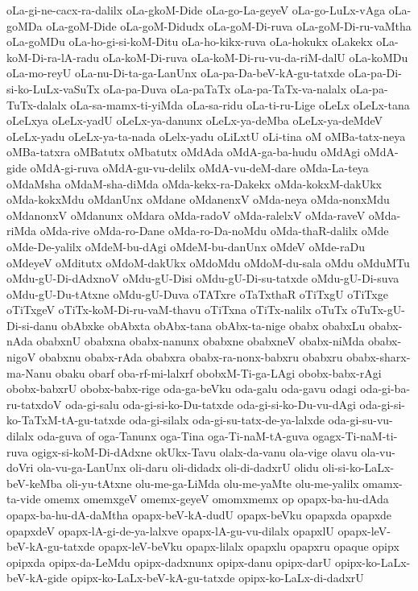 {oLa-gi-ne-cacx-ra-dalilx
oLa-gkoM-Dide
oLa-go-La-geyeV
oLa-go-LuLx-vAga
oLa-goMDa
oLa-goM-Dide
oLa-goM-Didudx
oLa-goM-Di-ruva
oLa-goM-Di-ru-vaMtha
oLa-goMDu
oLa-ho-gi-si-koM-Ditu
oLa-ho-kikx-ruva
oLa-hokukx
oLakekx
oLa-koM-Di-ra-lA-radu
oLa-koM-Di-ruva
oLa-koM-Di-ru-vu-da-riM-dalU
oLa-koMDu
oLa-mo-reyU
oLa-nu-Di-ta-ga-LanUnx
oLa-pa-Da-beV-kA-gu-tatxde
oLa-pa-Di-si-ko-LuLx-vaSuTx
oLa-pa-Duva
oLa-paTaTx
oLa-pa-TaTx-va-nalalx
oLa-pa-TuTx-dalalx
oLa-sa-mamx-ti-yiMda
oLa-sa-ridu
oLa-ti-ru-Lige
oLeLx
oLeLx-tana
oLeLxya
oLeLx-yadU
oLeLx-ya-danunx
oLeLx-ya-deMba
oLeLx-ya-deMdeV
oLeLx-yadu
oLeLx-ya-ta-nada
oLelx-yadu
oLiLxtU
oLi-tina
oM
oMBa-tatx-neya
oMBa-tatxra
oMBatutx
oMbatutx
oMdAda
oMdA-ga-ba-hudu
oMdAgi
oMdA-gide
oMdA-gi-ruva
oMdA-gu-vu-delilx
oMdA-vu-deM-dare
oMda-La-teya
oMdaMsha
oMdaM-sha-diMda
oMda-kekx-ra-Dakekx
oMda-kokxM-dakUkx
oMda-kokxMdu
oMdanUnx
oMdane
oMdanenxV
oMda-neya
oMda-nonxMdu
oMdanonxV
oMdanunx
oMdara
oMda-radoV
oMda-ralelxV
oMda-raveV
oMda-riMda
oMda-rive
oMda-ro-Dane
oMda-ro-Da-noMdu
oMda-thaR-dalilx
oMde
oMde-De-yalilx
oMdeM-bu-dAgi
oMdeM-bu-danUnx
oMdeV
oMde-raDu
oMdeyeV
oMditutx
oMdoM-dakUkx
oMdoMdu
oMdoM-du-sala
oMdu
oMduMTu
oMdu-gU-Di-dAdxnoV
oMdu-gU-Disi
oMdu-gU-Di-su-tatxde
oMdu-gU-Di-suva
oMdu-gU-Du-tAtxne
oMdu-gU-Duva
oTATxre
oTaTxthaR
oTiTxgU
oTiTxge
oTiTxgeV
oTiTx-koM-Di-ru-vaM-thavu
oTiTxna
oTiTx-nalilx
oTuTx
oTuTx-gU-Di-si-danu
obAbxke
obAbxta
obAbx-tana
obAbx-ta-nige
obabx
obabxLu
obabx-nAda
obabxnU
obabxna
obabx-nanunx
obabxne
obabxneV
obabx-niMda
obabx-nigoV
obabxnu
obabx-rAda
obabxra
obabx-ra-nonx-babxru
obabxru
obabx-sharx-ma-Nanu
obaku
obarf
oba-rf-mi-lalxrf
obobxM-Ti-ga-LAgi
obobx-babx-rAgi
obobx-babxrU
obobx-babx-rige
oda-ga-beVku
oda-galu
oda-gavu
odagi
oda-gi-ba-ru-tatxdoV
oda-gi-salu
oda-gi-si-ko-Du-tatxde
oda-gi-si-ko-Du-vu-dAgi
oda-gi-si-ko-TaTxM-tA-gu-tatxde
oda-gi-silalx
oda-gi-su-tatx-de-ya-lalxde
oda-gi-su-vu-dilalx
oda-guva
of
oga-Tanunx
oga-Tina
oga-Ti-naM-tA-guva
ogagx-Ti-naM-ti-ruva
ogigx-si-koM-Di-dAdxne
okUkx-Tavu
olalx-da-vanu
ola-vige
olavu
ola-vu-doVri
ola-vu-ga-LanUnx
oli-daru
oli-didadx
oli-di-dadxrU
olidu
oli-si-ko-LaLx-beV-keMba
oli-yu-tAtxne
olu-me-ga-LiMda
olu-me-yaMte
olu-me-yalilx
omamx-ta-vide
omemx
omemxgeV
omemx-geyeV
omomxmemx
op
opapx-ba-hu-dAda
opapx-ba-hu-dA-daMtha
opapx-beV-kA-dudU
opapx-beVku
opapxda
opapxde
opapxdeV
opapx-lA-gi-de-ya-lalxve
opapx-lA-gu-vu-dilalx
opapxlU
opapx-leV-beV-kA-gu-tatxde
opapx-leV-beVku
opapx-lilalx
opapxlu
opapxru
opaque
opipx
opipxda
opipx-da-LeMdu
opipx-dadxnunx
opipx-danu
opipx-darU
opipx-ko-LaLx-beV-kA-gide
opipx-ko-LaLx-beV-kA-gu-tatxde
opipx-ko-LaLx-di-dadxrU
}
